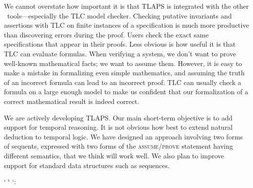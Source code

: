 \documentclass[a4paper,draft]{llncs}
\begin{document}
We cannot overstate how important it is that TLAPS is integrated with
the other \tlaplus\ tools---especially the TLC model checker.
Checking putative invariants and assertions with TLC on finite
instances of a specification is much more productive than discovering
errors during the proof. Users check the exact same specifications that
appear in their proofs.  Less obvious is how useful it is that TLC can
evaluate \tlaplus formulas.  When verifying a system, we don't
want to prove well-known mathematical facts; we want to assume them.
However, it is easy to make a mistake in formalizing even simple
mathematics, and assuming the truth of an incorrect formula can lead
to an incorrect proof.  TLC can usually check a formula on a large
enough model to make us confident that our formalization of a correct
mathematical result is indeed correct.

We are actively developing TLAPS. 
Our main short-term objective is to add support for temporal reasoning. It is
not obvious how best to extend natural deduction to temporal logic. We have
designed an approach involving two forms of sequents, expressed with two forms
of the \textsc{assume}/\textsc{prove} statement having
different semantics, that we think will work well.
We also plan to improve support for standard \tlaplus data structures such as
sequences.



%
\makeatletter
\newcommand{\realslash}{/}
\begingroup
\catcode`\/\active
\catcode`\.\active
\catcode`:\active
\gdef\urlslash{\@ifnextchar/{\doubleslash}{\discretionary{}{}{}\realslash}}
\gdef\urlend#1{\let/\urlslash\let.\urldot
                 \discretionary{}{}{}#1\discretionary{}{}{}\endgroup}
\endgroup
\newcommand{\urldot}{.\discretionary{}{}{}}
\renewcommand{\url}{\begingroup\urlbegin}
\newcommand{\urlbegin}{%
                       \catcode`\~12\relax
                       \catcode`\#12\relax
                       \catcode`\$12\relax
                       \catcode`\&12\relax
                       \catcode`\_12\relax
                       \catcode`\^12\relax
                       \catcode`\\12\relax
                       \catcode`\/\active
                       \catcode`\.\active
                       \tt
                       \urlend}
\newcommand{\doubleslash}[1]{\discretionary{}{}{}//}

\makeatother 



\end{document}
